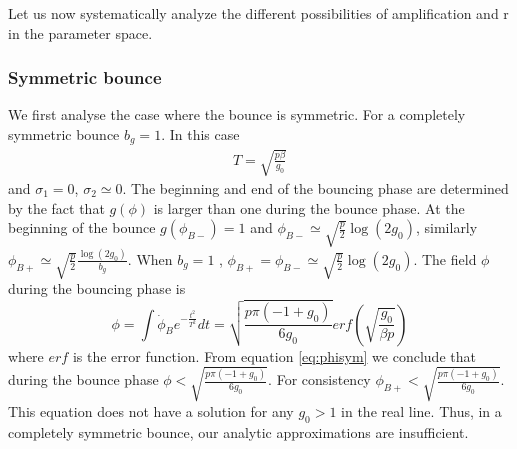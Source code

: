 \documentclass[12pt,a4paper]{article}
\newcommand{\IB}[1]{{\color{red}IB: #1}}
\numberwithin{equation}{section}
\numberwithin{equation}{section}
\begin{document}
Let us now systematically analyze the different possibilities of amplification and r in the parameter space. %
\subsubsection{Symmetric bounce}
We first analyse the case where the bounce is symmetric. For a completely symmetric bounce $b_g=1$. In this case 
\begin{equation}
    \begin{split}
        T = \sqrt{\frac{p \beta}{g_0}}
    \end{split}
\end{equation}
and $\sigma_1=0$, $\sigma_2\simeq0$.
The beginning and end of the bouncing phase are determined by the fact that $g(\phi)$ is larger than one during the bounce phase. At the beginning of the bounce $g(\phi_{B-})=1$ and $\phi_{B-} \simeq \sqrt{\frac{p}{2}}\log(2g_0)$, similarly   $\phi_{B+} \simeq \sqrt{\frac{p}{2}} \frac{\log(2g_0)}{b_g}$. When $b_g=1$ , $\phi_{B+}=\phi_{B-} \simeq \sqrt{\frac{p}{2}}\log(2g_0)$. The field $\phi$ during the bouncing phase is
\begin{equation}
    \phi = \int \dot{\phi}_B e^{-\frac{t^2}{T^2} } dt = \sqrt{\frac{p \pi (-1+g_0)}{6 g_0}} erf\left(\sqrt{\frac{g_0 }{\beta p}} \right)
    \label{eq:phisym}
\end{equation}
where $erf$ is the error function. From equation \eqref{eq:phisym} we conclude that during the bounce phase $\phi < \sqrt{\frac{p \pi (-1+g_0)}{6 g_0}}$. For consistency $\phi_{B+} <\sqrt{\frac{p \pi (-1+g_0)}{6 g_0}}$. This equation does not have a solution for any $g_0>1$ in the real line. Thus, in a completely symmetric bounce, our analytic approximations are insufficient. %
\end{document}
